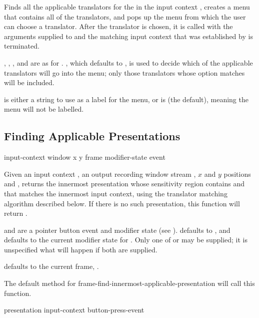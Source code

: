 Finds all the applicable translators for the 
 in the input context , creates a menu that
contains all of the translators, and pops up the menu from which the user can
choose a translator.  After the translator is chosen, it is called with the
arguments supplied to  and the matching input context
that was established by  is terminated.

, , , and  are as for
.  , which defaults to , is
used to decide which of the applicable translators will go into the menu; only
those translators whose  option matches  will be included.

 is either a string to use as a label for the menu, or is 
(the default), meaning the menu will not be labelled.


\subsection {Finding Applicable Presentations}

 {input-context window x y 
                                                 \key frame modifier-state event}

Given an input context , an output recording window stream
, $x$ and $y$ positions  and , returns the innermost
presentation whose sensitivity region contains  and  that matches
the innermost input context, using the translator matching algorithm described
below.  If there is no such presentation, this function will return .

 and  are a pointer button event and modifier
state (see ).   defaults to ,
and  defaults to the current modifier state for
.  Only one of  or  may be supplied;
it is unspecified what will happen if both are supplied.

 defaults to the current frame, .

The default method for {frame-find-innermost-applicable-presentation} will call
this function.


 {presentation input-context button-press-event}

